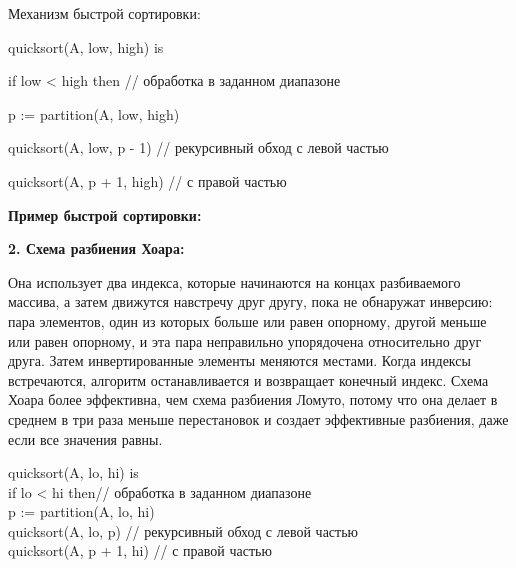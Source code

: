 Механизм быстрой сортировки:
\begin{tcolorbox}[breakable,enhanced,before upper={\parindent10pt}]
\noindent quicksort(A, low, high) is

if low < high then // обработка в заданном диапазоне

\indent p := partition(A, low, high) 

\indent quicksort(A, low, p - 1) // рекурсивный обход с левой частью

\indent quicksort(A, p + 1, high) // с правой частью

\end{tcolorbox}

\vspace{\baselineskip}

\textbf{Пример быстрой сортировки:}


\vspace{\baselineskip}

\textbf{2. Схема разбиения Хоара:}

\vspace{\baselineskip}

Она использует два индекса, которые начинаются на концах разбиваемого массива, а затем движутся навстречу друг другу, пока не обнаружат инверсию: пара элементов, один из которых больше или равен опорному, другой меньше или равен опорному, и эта пара неправильно упорядочена относительно друг друга. Затем инвертированные элементы меняются местами. Когда индексы встречаются, алгоритм останавливается и возвращает конечный индекс. Схема Хоара более эффективна, чем схема разбиения Ломуто, потому что она делает в среднем в три раза меньше перестановок и создает эффективные разбиения, даже если все значения равны.

\begin{tcolorbox}[breakable,enhanced,before upper={\parindent10pt}]
\noindent quicksort(A, lo, hi) is\\
if lo < hi then// обработка в заданном диапазоне\\
\indent p := partition(A, lo, hi)\\
\indent quicksort(A, lo, p) // рекурсивный обход с левой частью\\
\indent quicksort(A, p + 1, hi) // с правой частью\\
\end{tcolorbox}

\vspace{\baselineskip}

